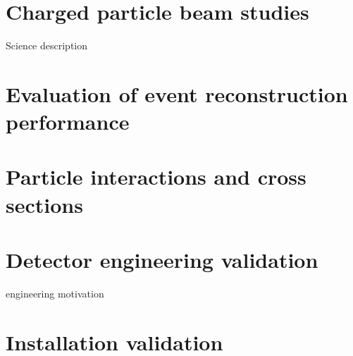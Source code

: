 
\section{Charged particle beam studies}
Science description


\section{Evaluation of event reconstruction performance}

\section{Particle interactions and cross sections}

\section{Detector engineering validation}
engineering motivation

\section{Installation validation}




